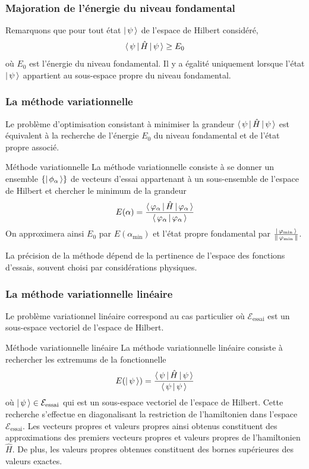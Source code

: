         \subsubsection{Majoration de l’énergie du niveau fondamental}

    Remarquons que pour tout état $\left| \, \psi \, \right>$ de l’espace de Hilbert considéré, 
    \[ \left< \, \psi \, \right| \hat{H} \left| \, \psi \, \right> \geq E_0 \]   
    où $E_0$ est l’énergie du niveau fondamental. Il y a égalité uniquement lorsque l’état $\left| \, \psi \, \right>$ appartient au sous-espace propre du niveau fondamental. 

        \subsubsection{La méthode variationnelle}

    Le problème d’optimisation consistant à minimiser la grandeur $\left< \, \psi \, \right| \hat{H} \left| \, \psi \, \right>$ est équivalent à la recherche de l’énergie $E_0$ du niveau fondamental et de l’état propre associé. 

    \begin{omed}{Méthode variationnelle}
        La méthode variationnelle consiste à se donner un ensemble $\left\{\left| \, \phi_{\alpha} \, \right>\right\}$ de vecteurs d’essai appartenant à un sous-ensemble de l’espace de Hilbert et chercher le minimum de la grandeur 
        \[ E(\alpha) = \frac{\left< \, \varphi_{\alpha} \, \right| \hat{H} \left| \, \varphi_{\alpha} \, \right> }{\left< \, \varphi_{\alpha} \, \middle| \, \varphi_{\alpha} \, \right>} \]   
        On approximera ainsi $E_0$ par $E(\alpha_{\text{min}})$ et l’état propre fondamental par $\frac{\left| \, \varphi_{\text{min}} \, \right>}{\left\lVert \, \varphi_{\text{min}} \, \right\rVert}$. 
    \end{omed}

    La précision de la méthode dépend de la pertinence de l’espace des fonctions d’essais, souvent choisi par considérations physiques.

        \subsubsection{La méthode variationnelle linéaire}

    Le problème variationnel linéaire correspond au cas particulier où $\mathcal{E}_{\text{essai}}$ est un sous-espace vectoriel de l’espace de Hilbert. 

    \begin{omed}{Méthode variationnelle linéaire}
        La méthode variationnelle linéaire consiste à rechercher les extremums de la fonctionnelle 
        \[ E(\left| \, \psi \, \right>) = \frac{\left< \, \psi \, \right| \hat{H} \left| \, \psi \, \right> }{\left< \, \psi \, \middle| \, \psi \, \right>} \]   
        où $\left| \, \psi \, \right> \in \mathcal{E}_{\text{essai}}$ qui est un sous-espace vectoriel de l’espace de Hilbert. Cette recherche s’effectue en diagonalisant la restriction de l’hamiltonien dans l’espace $\mathcal{E}_{\text{essai}}$. Les vecteurs propres et valeurs propres ainsi obtenus constituent des approximations des premiers vecteurs propres et valeurs propres de l’hamiltonien $\hat{H}$. De plus, les valeurs propres obtenues constituent des bornes supérieures des valeurs exactes.
    \end{omed}
 
